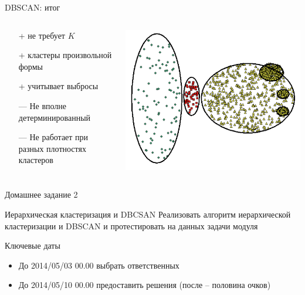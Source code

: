 \documentclass[10pt,a4paper]{beamer}
\begin{document}
\begin{frame}{DBSCAN: итог}

\begin{columns}[C]
    \begin{column}{.6\textwidth} 
    \begin{itemize}
	\item[+] не требует $K$
	\item[+] кластеры произвольной формы
	\item[+] учитывает выбросы
	\item[---] Не вполне детерминированный
	\item[---] Не работает при разных плотностях кластеров
	\end{itemize}		    
    \end{column}
    \begin{column}{.4\textwidth}
    \vspace{1em}
    \includegraphics[scale=0.25]{images/dbprob.png}    
    \end{column}
\end{columns}

\end{frame}


\begin{frame}{Домашнее задание 2}

\begin{block}{Иерархическая кластеризация и DBCSAN}
Реализовать алгоритм иерархической кластеризации и DBSCAN и протестировать на данных задачи модуля
\end{block}

\vspace{1em}
Ключевые даты
\begin{itemize}
\item До 2014/05/03 00.00 выбрать ответственных
\item До 2014/05/10 00.00 предоставить решения (после -- половина очков)
\end{itemize}

\end{frame}
\end{document}
